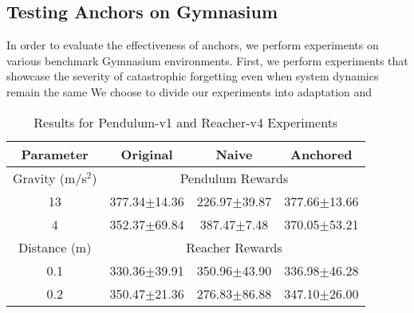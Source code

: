\documentclass[letterpaper, 10 pt, conference]{ieeeconf} %
\begin{document}
    \subsection{Testing Anchors on Gymnasium}\label{subsec:simAnchors}
        In order to evaluate the effectiveness of anchors, we perform experiments on various benchmark Gymnasium environments.
        First, we perform experiments that showcase the severity of catastrophic forgetting even when system dynamics remain the same
        We choose to divide our experiments into adaptation and 

\begin{table}[h]
\caption{Results for Pendulum-v1 and Reacher-v4 Experiments}
\label{tab:combined_results}
\centering
\begin{tabular}{c|ccc}
\hline
Parameter & Original & Naive & Anchored \\
\hline\hline
Gravity (m/s$^2$) & \multicolumn{3}{c}{Pendulum Rewards} \\
\hline
13 & 377.34$\pm$14.36 & 226.97$\pm$39.87 & 377.66$\pm$13.66 \\
4 & 352.37$\pm$69.84 & 387.47$\pm$7.48 & 370.05$\pm$53.21 \\
\hline\hline
Distance (m) & \multicolumn{3}{c}{Reacher Rewards} \\
\hline
0.1 & 330.36$\pm$39.91 & 350.96$\pm$43.90 & 336.98$\pm$46.28 \\
0.2 & 350.47$\pm$21.36 & 276.83$\pm$86.88 & 347.10$\pm$26.00 \\
\hline
\end{tabular}
\end{table}



        
\end{document}
